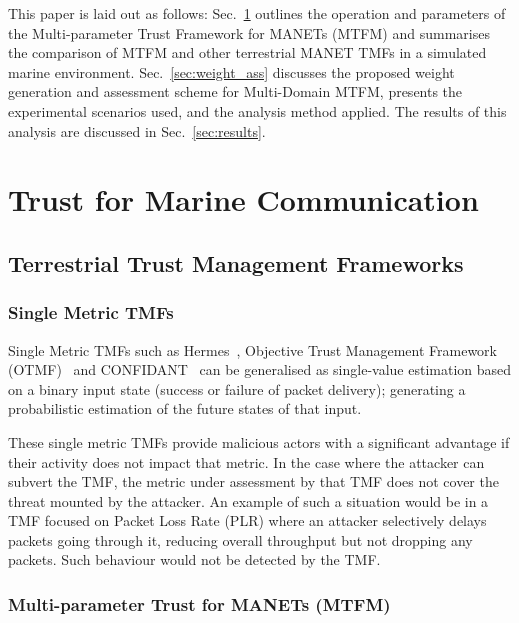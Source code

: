 \documentclass[conference]{IEEEtran}
\begin{document}
This paper is laid out as follows: Sec.~\ref{sec:mtfm} outlines the operation and parameters of the Multi-parameter Trust Framework for MANETs (MTFM) and summarises the comparison of MTFM and other terrestrial MANET TMFs in a simulated marine environment.
Sec.~\ref{sec:weight_ass} discusses the proposed weight generation and assessment scheme for Multi-Domain MTFM, presents the experimental scenarios used, and the analysis method applied.
The results of this analysis are discussed in Sec.~\ref{sec:results}.

\section{Trust for Marine Communication}\label{sec:mtfm}

\subsection{Terrestrial Trust Management Frameworks}

\subsubsection{Single Metric TMFs}

Single Metric TMFs such as Hermes~\cite{Zouridaki2005}, Objective Trust Management Framework (OTMF)~\cite{Li2008} and CONFIDANT~\cite{Buchegger2002} can be generalised as single-value estimation based on a binary input state (success or failure of packet delivery); generating a probabilistic estimation of the future states of that input. 

These single metric TMFs provide malicious actors with a significant advantage if their activity does not impact that metric.
In the case where the attacker can subvert the TMF, the metric under assessment by that TMF does not cover the threat mounted by the attacker.
An example of such a situation would be in a TMF focused on Packet Loss Rate (PLR) where an attacker selectively delays packets going through it, reducing overall throughput but not dropping any packets.
Such behaviour would not be detected by the TMF.

\subsubsection{Multi-parameter Trust for MANETs (MTFM)}
\end{document}
